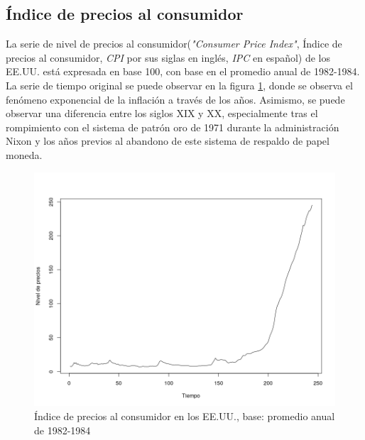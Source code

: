 \documentclass[a4paper]{article}
\begin{document}
\subsection{Índice de precios al consumidor}
La serie de nivel de precios al consumidor(\textit{"Consumer Price Index"}, Índice de precios al consumidor, \textit{CPI} por sus siglas en inglés, \textit{IPC} en español) de los EE.UU. está expresada en base 100, con base en el promedio anual de 1982-1984. La serie de tiempo original se puede observar en la figura \ref{fig:cpi_orig}, donde se observa el fenómeno exponencial de la inflación a través de los años. Asimismo, se puede observar una diferencia entre los siglos XIX y XX, especialmente tras el rompimiento con el sistema de patrón oro de 1971 durante la administración Nixon y los años previos al abandono de este sistema de respaldo de papel moneda.

\begin{figure}[H]
	\centering
	\includegraphics[width=0.8\linewidth]{cpi_orig.png}
	\caption{Índice de precios al consumidor en los EE.UU., base: promedio anual de 1982-1984} 	
	\label{fig:cpi_orig}
\end{figure}
\end{document}
